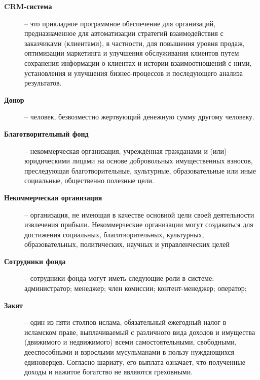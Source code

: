 \begin{description}
		\item[\textbf{CRM-система}] -- это прикладное программное обеспечение для организаций, предназначенное для автоматизации стратегий взаимодействия с заказчиками (клиентами), в частности, для повышения уровня продаж, оптимизации маркетинга и улучшения обслуживания клиентов путем сохранения информации о клиентах и истории взаимоотношений с ними, установления и улучшения бизнес-процессов и последующего анализа результатов. \label{terms:crm}
		\item[\textbf{Донор}] -- человек, безвозместно жертвующий денежную сумму другому человеку. \label{terms:donor}
		\item[\textbf{Благотворительный фонд}] --   некоммерческая организация, учреждённая гражданами и (или) юридическими лицами на основе добровольных имущественных взносов, преследующая благотворительные, культурные, образовательные или иные социальные, общественно полезные цели. \label{terms:fund}
		\item[\textbf{Некоммерческая организация}] --  организация, не имеющая в качестве основной цели своей деятельности извлечения прибыли. Некоммерческие организации могут создаваться для достижения социальных, благотворительных, культурных, образовательных, политических, научных и управленческих целей \label{terms:nko}
		
		\item[\textbf{Сотрудники фонда}] -- сотрудники фонда могут иметь следующие роли в системе: администратор; менеджер; член комиссии; контент-менеджер; оператор;
		\label{terms:stuff}
		
		\item[\textbf{Закят}] -- один из пяти столпов ислама, обязательный ежегодный налог в исламском праве, выплачиваемый с различного вида доходов и имущества (движимого и недвижимого) всеми самостоятельными, свободными, дееспособными и взрослыми мусульманами в пользу нуждающихся единоверцев. Согласно шариату, его выплата означает, что полученные доходы и нажитое богатство не являются греховными.
		\label{terms:zakyat}
	\end{description}